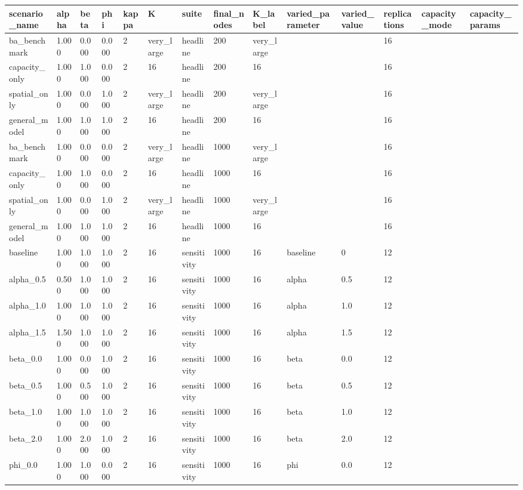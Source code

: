 \begin{tabular}{llllllllllllll}
\toprule
scenario\_name & alpha & beta & phi & kappa & K & suite & final\_nodes & K\_label & varied\_parameter & varied\_value & replications & capacity\_mode & capacity\_params \\
\midrule
ba\_benchmark & 1.000 & 0.000 & 0.000 & 2 & very\_large & headline & 200 & very\_large &  &  & 16 &  &  \\
capacity\_only & 1.000 & 1.000 & 0.000 & 2 & 16 & headline & 200 & 16 &  &  & 16 &  &  \\
spatial\_only & 1.000 & 0.000 & 1.000 & 2 & very\_large & headline & 200 & very\_large &  &  & 16 &  &  \\
general\_model & 1.000 & 1.000 & 1.000 & 2 & 16 & headline & 200 & 16 &  &  & 16 &  &  \\
ba\_benchmark & 1.000 & 0.000 & 0.000 & 2 & very\_large & headline & 1000 & very\_large &  &  & 16 &  &  \\
capacity\_only & 1.000 & 1.000 & 0.000 & 2 & 16 & headline & 1000 & 16 &  &  & 16 &  &  \\
spatial\_only & 1.000 & 0.000 & 1.000 & 2 & very\_large & headline & 1000 & very\_large &  &  & 16 &  &  \\
general\_model & 1.000 & 1.000 & 1.000 & 2 & 16 & headline & 1000 & 16 &  &  & 16 &  &  \\
baseline & 1.000 & 1.000 & 1.000 & 2 & 16 & sensitivity & 1000 & 16 & baseline & 0 & 12 &  &  \\
alpha\_0.5 & 0.500 & 1.000 & 1.000 & 2 & 16 & sensitivity & 1000 & 16 & alpha & 0.5 & 12 &  &  \\
alpha\_1.0 & 1.000 & 1.000 & 1.000 & 2 & 16 & sensitivity & 1000 & 16 & alpha & 1.0 & 12 &  &  \\
alpha\_1.5 & 1.500 & 1.000 & 1.000 & 2 & 16 & sensitivity & 1000 & 16 & alpha & 1.5 & 12 &  &  \\
beta\_0.0 & 1.000 & 0.000 & 1.000 & 2 & 16 & sensitivity & 1000 & 16 & beta & 0.0 & 12 &  &  \\
beta\_0.5 & 1.000 & 0.500 & 1.000 & 2 & 16 & sensitivity & 1000 & 16 & beta & 0.5 & 12 &  &  \\
beta\_1.0 & 1.000 & 1.000 & 1.000 & 2 & 16 & sensitivity & 1000 & 16 & beta & 1.0 & 12 &  &  \\
beta\_2.0 & 1.000 & 2.000 & 1.000 & 2 & 16 & sensitivity & 1000 & 16 & beta & 2.0 & 12 &  &  \\
phi\_0.0 & 1.000 & 1.000 & 0.000 & 2 & 16 & sensitivity & 1000 & 16 & phi & 0.0 & 12 &  &  \\

\end{tabular}
